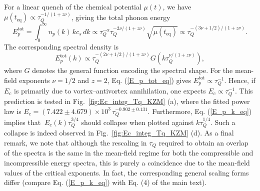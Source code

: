 \documentclass[aps,prl,twocolumn,showpacs,notitlepage,floatfix,superscriptaddress]{revtex4-1}
\begin{document}
For a linear quench of the chemical potential $\mu(t)$, we have $\mu(t_{\textrm{eq}}) \propto \tau_Q^{-1/(1 + z \nu)}$, giving the total phonon energy
\begin{equation}\label{E_p_tot_eq}
E_p^{\mathrm{tot}}
= \int_0^\infty n_p(k)\,
k 
c_s
\,dk
\propto
\tau_Q^{-\alpha}
\tau_Q^{-2\nu/(1 + z \nu)}
\sqrt{\mu(t_{\textrm{eq}})}
\propto
\tau_Q^{-(3\nu + 1/2)/(1 + z \nu)}.
\end{equation}
The corresponding spectral density is
\begin{equation}\label{E_p_k_eq}
E^{\textrm{tot}}_p (k) 
\propto 
\tau_Q^{- \left( 2 \nu + 1 / 2 \right) / \left( 1 + z \nu \right)} 
G \left( k \tau_Q^{\nu / \left( 1 + z \nu \right)} \right),
\end{equation}
where $G$ denotes the general function encoding the spectral shape.
For the mean-field exponents $\nu = 1/2$ and $z = 2$, Eq. (\ref{E_p_tot_eq}) gives $E_p^{\mathrm{tot}} \propto \tau_Q^{-1}$. 
Hence, if $E_c$ is primarily due to vortex–antivortex annihilation, one expects $E_c \propto \tau_Q^{-1}$. 
This prediction is tested in Fig.~\ref{fig:Ec_integ_Tq_KZM} (a), where the fitted power law is 
$E_c = (7.422 \pm 4.679)\times 10^3\,\tau_Q^{-0.902 \pm 0.131}$.
Furthermore, Eq. (\ref{E_p_k_eq}) implies that $\ E_c(k)\tau_Q^{3/4}$ should collapse when plotted against $k\tau_Q^{1/4}$. Such a collapse is indeed observed in Fig.~\ref{fig:Ec_integ_Tq_KZM} (d).
As a final remark, we note that although the rescaling in $\tau_{Q}$ required to obtain an overlap of the spectra is the same in the mean-field regime for both the compressible and incompressible energy spectra, this is purely a coincidence due to the mean-field values of the critical exponents. In fact, the corresponding general scaling forms differ (compare Eq. (\ref{E_p_k_eq}) with Eq. (4) of the main text).
\bigskip
\end{document}
